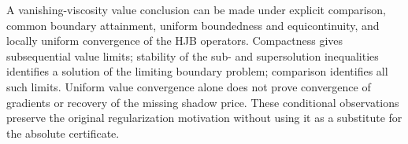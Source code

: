 A vanishing-viscosity value conclusion can be made under explicit comparison, common boundary attainment, uniform boundedness and equicontinuity, and locally uniform convergence of the HJB operators. Compactness gives subsequential value limits; stability of the sub- and supersolution inequalities identifies a solution of the limiting boundary problem; comparison identifies all such limits. Uniform value convergence alone does not prove convergence of gradients or recovery of the missing shadow price. These conditional observations preserve the original regularization motivation without using it as a substitute for the absolute certificate.
